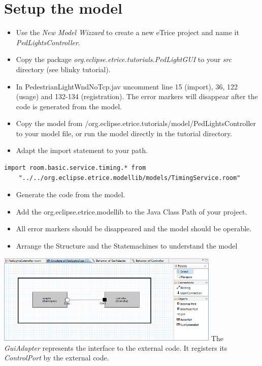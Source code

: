 \section{Setup the model}

\begin{itemize}
\item Use the \textit{New Model Wizzard} to create a new eTrice project and name it \textit{PedLightsController}.
\item Copy the package \textit{org.eclipse.etrice.tutorials.PedLightGUI} to your \textit{src} directory (see blinky tutorial).
\item In PedestrianLightWndNoTcp.jav uncomment line 15 (import), 36, 122 (usage) and 132-134 (registration). The error markers will disappear after the code is generated from the model.
\item \begin{flushleft}Copy the model from /org.eclipse.etrice.tutorials/model/PedLightsController to your model file, or run the model directly in the tutorial directory.\end{flushleft} 
\item Adapt the import statement to your path.
\end{itemize}

\begin{small}
\begin{verbatim} 
import room.basic.service.timing.* from 
	"../../org.eclipse.etrice.modellib/models/TimingService.room" 
\end{verbatim}
\end{small}

\begin{itemize}
\item Generate the code from the model.
\item Add the org.eclipse.etrice.modellib to the Java Class Path of your project.
\item All error markers should be disappeared and the model should be operable. 
\item Arrange the Structure and the Statemachines to understand the model
\end{itemize}

\includegraphics[width=0.8\textwidth]{images/030-PedLights01.png}
The \textit{GuiAdapter} represents the interface to the external code. It registers its \textit{ControlPort} by the external code.

